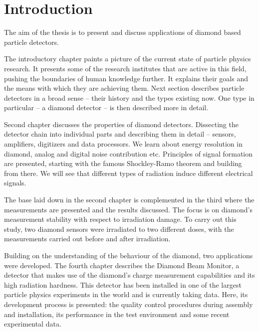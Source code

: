 \documentclass[twoside,12pt]{packages/mytustyle}  %
\begin{document}
\baselineskip=15pt



\chapter{Introduction}


The aim of the thesis is to present and discuss applications of diamond based particle detectors. 

The introductory chapter paints a picture of the current state of particle physics research. It presents some of the research institutes that are active in this field, pushing the boundaries of human knowledge further. It explains their goals and the means with which they are achieving them. Next section describes particle detectors in a broad sense -- their history and the types existing now. One type in particular -- a diamond detector -- is then described more in detail.

Second chapter discusses the properties of diamond detectors. Dissecting the detector chain into individual parts and describing them in detail -- sensors, amplifiers, digitizers and data processors. We learn about energy resolution in diamond, analog and digital noise contribution etc. Principles of signal formation are presented, starting with the famous Shockley-Ramo theorem and building from there. We will see that different types of radiation induce different electrical signals.

The base laid down in the second chapter is complemented in the third where the measurements are presented and the results discussed. The focus is on diamond's measurement stability with respect to irradiation damage. To carry out this study, two diamond sensors were irradiated to two different doses, with the measurements carried out before and after irradiation.

Building on the understanding of the behaviour of the diamond, two applications were developed. The fourth chapter describes the Diamond Beam Monitor, a detector that makes use of the diamond's charge measurement capabilities and its high radiation hardness. This detector has been installed in one of the largest particle physics experiments in the world and is currently taking data. Here, its development process is presented: the quality control procedures during assembly and installation, its performance in the test environment and some recent experimental data.
\end{document}
